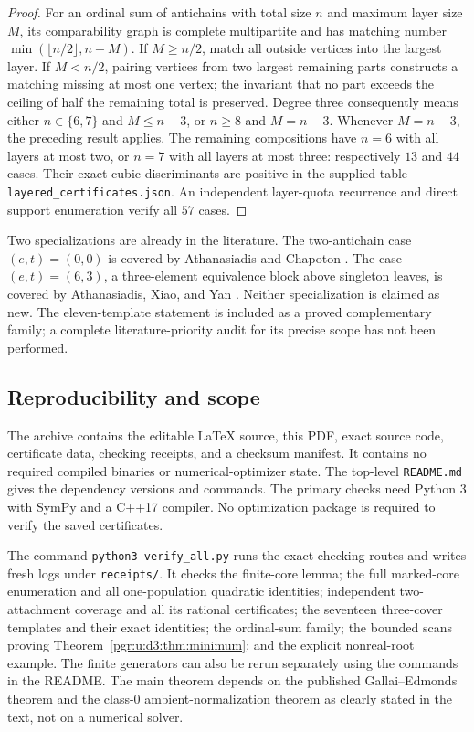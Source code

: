 \documentclass[11pt]{article}
\numberwithin{equation}{section}
\theoremstyle{definition}\newtheorem{definition}[theorem]{Definition}\newtheorem{remark}[theorem]{Remark}
\begin{document}
\begin{proof}
For an ordinal sum of antichains with total size $n$ and maximum layer size $M$, its comparability graph is complete multipartite and has matching number
$\min(\lfloor n/2\rfloor,n-M)$. If $M\ge n/2$, match all outside vertices into the largest layer. If $M<n/2$, pairing vertices from two largest remaining parts constructs a matching missing at most one vertex; the invariant that no part exceeds the ceiling of half the remaining total is preserved. Degree three consequently means either $n\in\{6,7\}$ and $M\le n-3$, or $n\ge8$ and $M=n-3$. Whenever $M=n-3$, the preceding result applies. The remaining compositions have $n=6$ with all layers at most two, or $n=7$ with all layers at most three: respectively $13$ and $44$ cases. Their exact cubic discriminants are positive in the supplied table \texttt{layered\_certificates.json}. An independent layer-quota recurrence and direct support enumeration verify all $57$ cases.
\end{proof}

Two specializations are already in the literature. The two-antichain case $(e,t)=(0,0)$ is covered by Athanasiadis and Chapoton \cite[Proposition 9.2]{AC}. The case $(e,t)=(6,3)$, a three-element equivalence block above singleton leaves, is covered by Athanasiadis, Xiao, and Yan \cite[Remark 2.3]{AXY}. Neither specialization is claimed as new. The eleven-template statement is included as a proved complementary family; a complete literature-priority audit for its precise scope has not been performed.

\subsection{Reproducibility and scope}

The archive contains the editable LaTeX source, this PDF, exact source code, certificate data, checking receipts, and a checksum manifest. It contains no required compiled binaries or numerical-optimizer state. The top-level \texttt{README.md} gives the dependency versions and commands. The primary checks need Python 3 with SymPy and a C++17 compiler. No optimization package is required to verify the saved certificates.

The command \texttt{python3 verify\_all.py} runs the exact checking routes and writes fresh logs under \texttt{receipts/}. It checks the finite-core lemma; the full marked-core enumeration and all one-population quadratic identities; independent two-attachment coverage and all its rational certificates; the seventeen three-cover templates and their exact identities; the ordinal-sum family; the bounded scans proving Theorem~\ref{pgr:u:d3:thm:minimum}; and the explicit nonreal-root example. The finite generators can also be rerun separately using the commands in the README. The main theorem depends on the published Gallai--Edmonds theorem and the class-0 ambient-normalization theorem as clearly stated in the text, not on a numerical solver.
\end{document}
